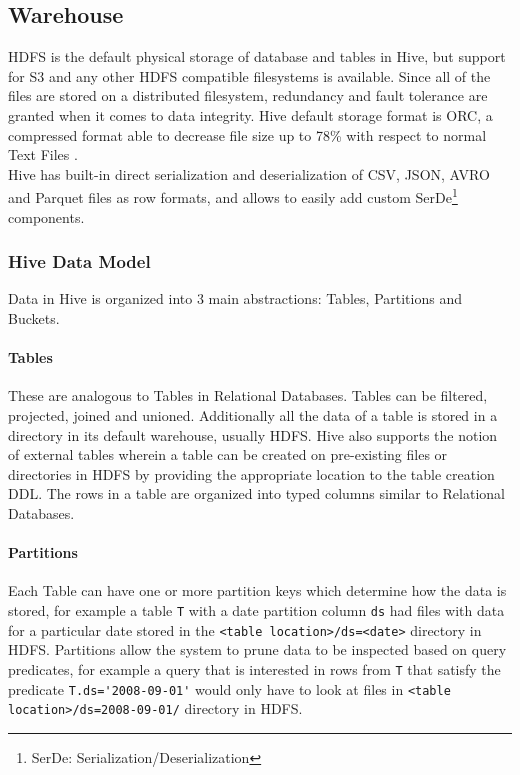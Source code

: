 \subsection{Warehouse}
HDFS is the default physical storage of database and tables in Hive, but support for S3 and any other HDFS compatible filesystems is available. Since all of the files are stored on a distributed filesystem, redundancy and fault tolerance are granted when it comes to data integrity. Hive default storage format is ORC, a compressed format able to decrease file size up to 78\% with respect to normal Text Files \cite{orc_format}.\\
Hive has built-in direct serialization and deserialization of CSV, JSON, AVRO and Parquet files as row formats, and allows to easily add custom SerDe\footnote{SerDe: Serialization/Deserialization} components.

\subsubsection{Hive Data Model}

Data in Hive is organized into 3 main abstractions: Tables, Partitions and Buckets.

\paragraph{Tables} These are analogous to Tables in Relational Databases. Tables can be filtered, projected, joined and unioned. Additionally all the data of a table is stored in a directory in its default warehouse, usually HDFS. Hive also supports the notion of external tables wherein a table can be created on pre-existing files or directories in HDFS by providing the appropriate location to the table creation DDL. The rows in a table are organized into typed columns similar to Relational Databases.
\paragraph{Partitions} Each Table can have one or more partition keys which determine how the data is stored, for example a table \verb|T| with a date partition column  \verb|ds| had files with data for a particular date stored in the  \verb|<table location>/ds=<date>| directory in HDFS. Partitions allow the system to prune data to be inspected based on query predicates, for example a query that is interested in rows from \verb|T| that satisfy the predicate \verb|T.ds='2008-09-01'| would only have to look at files in \verb|<table location>/ds=2008-09-01/| directory in HDFS.
